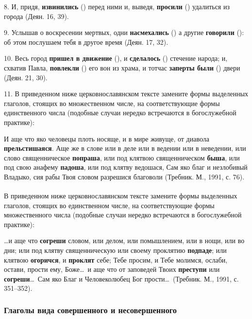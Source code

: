\documentclass[11pt,a4paper,oneside]{memoir}
\newcommand{\exercise}{}
\begin{document}
8. И, придя, \textbf{извинились} ({}) перед ними и, выведя, \textbf{просили} ({}) удалиться из города (Деян. 16, 39).

9. Услышав о воскресении мертвых, одни \textbf{насмехались} ({}) а другие \textbf{говорили} ({}): об этом послушаем тебя в другое время (Деян. 17, 32).

10. Весь город \textbf{пришел в движение} ({}), и \textbf{сделалось} ({}) стечение народа; и, схватив Павла, \textbf{повлекли} ({}) его вон из храма, и тотчас \textbf{заперты были} ({}) двери (Деян. 21, 30).

11. В приведенном ниже церковнославянском тексте замените формы выделенных глаголов, стоящих во множественном числе, на соответствующие формы единственного числа (подобные случаи нередко встречаются в богослужебной практике):

И аще что яко человецы плоть носяще, и в мире живуще, от диавола \textbf{прельстишаяся}. Аще же в слове или в деле или в ведении или в неведении, или слово священническое \textbf{попраша}, или под клятвою священническом \textbf{быша}, или под свою анафему \textbf{падоша}, или под клятву ведошася, Сам яко благ и незлобивый Владыко, сия рабы Твоя словом разрешися благоволи (Требник. М., 1991, с. 76).

\paragraph{\exercise}

В приведенном ниже церковнославянском тексте замените формы выделенных глаголов, стоящих во единственном числе, на соответствующие формы множественного числа (подобные случаи нередко встречаются в богослужебной практике):

\ldots и аще что \textbf{согреши} словом, или делом, или помышлением, или в нощи, или во дни; или под клятву священническую или своему проклятию \textbf{подпаде}; или клятвою \textbf{огоричся}, и \textbf{проклят} себе; Тебе просим, и Тебе молимся, ослаби, остави, прости ему, Боже\ldots~и аще что от заповедей Твоих \textbf{преступи} или \textbf{согреши}\ldots~Сам яко Благ и Человеколюбец Бог прости\ldots~(Требник. М., 1991, с. 351--352).

\subsubsection{Глаголы вида совершенного и несовершенного}
\end{document}
